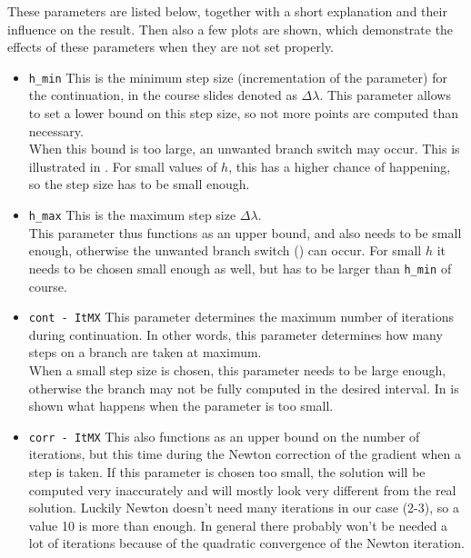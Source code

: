 \documentclass[a4paper,11pt]{article}
\begin{document}
These parameters are listed below, together with a short explanation and their influence on the result. Then also
a few plots are shown, which demonstrate the effects of these parameters when they are not set properly.\\
\begin{itemize}
	\item \texttt{h\_min}\: This is the minimum step size (incrementation of the parameter) for the continuation, in the course
	slides denoted as $\Delta\lambda$. This parameter allows to set a lower bound on this step size, so not more points are computed
	than necessary. \\When this bound is too large, an unwanted branch switch may occur. This is illustrated in .
	For small values of $h$, this has a higher chance of happening, so the step size has to be small enough.
	\item \texttt{h\_max}\: This is the maximum step size $\Delta\lambda$. \\This parameter thus functions as an upper bound, and also
	needs to be small enough, otherwise the unwanted branch switch () can occur. For small $h$ it needs to be chosen small
	enough as well, but has to be larger than \texttt{h\_min} of course.
	\item \texttt{cont - ItMX}\: This parameter determines the maximum number of iterations during continuation. In other words,
	this parameter determines how many steps on a branch are taken at maximum. \\When a small step size is chosen, this parameter
	needs to be large enough, otherwise the branch may not be fully computed in the desired interval. In  is shown
	what happens when the parameter is too small.
	\item \texttt{corr - ItMX}\: This also functions as an upper bound on the number of iterations, but this time during the Newton
	correction of the gradient when a step is taken. If this parameter is chosen too small, the solution will be computed very inaccurately and will
	mostly look very different from the real solution.
	Luckily Newton doesn't need many iterations in our case (2-3), so a value 10 is more than enough. In general there probably won't be needed
	a lot of iterations because of the quadratic convergence of the Newton iteration.
\end{itemize}
\end{document}
